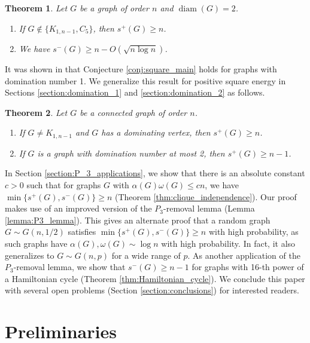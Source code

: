 \documentclass{article}
\newtheorem{theorem}{Theorem}[section]
\DeclareMathOperator{\diam}{diam}
\begin{document}
\begin{theorem}\label{thm:diameter_2_main}
Let $G$ be a graph of order $n$ and $\diam(G)=2$. 
\begin{enumerate}[$(i)$]
    \item If $G\not \in \{K_{1,n-1}, C_5\}$, then $s^+(G)\geq n$.
    \item We have $s^-(G) \ge n -O(\sqrt{n\log n})$.
\end{enumerate}
\end{theorem}

It was shown in \cite{Zhang_2024_Extremal} that Conjecture \ref{conj:square_main} holds for graphs with domination number 1. We generalize this result for positive square energy in Sections \ref{section:domination_1} and \ref{section:domination_2} as follows. 

\begin{theorem} Let $G$ be a connected graph of order $n$. 
\begin{enumerate}[$(i)$]
    \item If $G\neq K_{1,n-1}$ and $G$ has a dominating vertex, then $s^+(G)\geq n$.
    \item If $G$ is a graph with domination number at most 2, then $s^+(G)\ge n-1$.
\end{enumerate}
\end{theorem}

In Section \ref{section:P_3_applications}, we show that there is an absolute constant $c>0$ such that for graphs $G$ with $\alpha(G)\omega(G)\le cn$, we have $\min\{s^+(G), s^-(G)\}\ge n$ (Theorem \ref{thm:clique_independence}). Our proof makes use of an improved version of the $P_3$-removal lemma (Lemma \ref{lemma:P3_lemma}). This gives an alternate proof that a random graph $G \sim G(n, 1/2)$ satisfies $\min\{s^+(G), s^-(G)\} \geq n$ with high probability, as such graphs have $\alpha(G), \omega(G) \sim \log n$ with high probability. In fact, it also generalizes to $G \sim G(n, p)$ for a wide range of $p$. As another application of the $P_3$-removal lemma, we show that $s^-(G) \ge n - 1$ for graphs with 16-th power of a Hamiltonian cycle (Theorem \ref{thm:Hamiltonian_cycle}). We conclude this paper with several open problems (Section \ref{section:conclusions}) for interested readers. 


\section{Preliminaries}\label{section:prelims}
\end{document}
